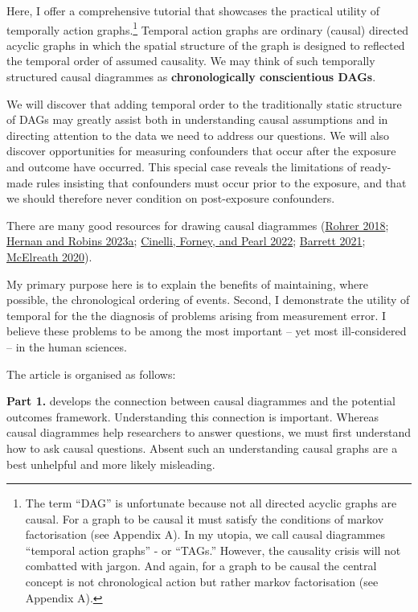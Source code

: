 \documentclass[
  singlecolumn]{report}
\begin{document}
Here, I offer a comprehensive tutorial that showcases the practical
utility of temporally action graphs.\footnote{The term ``DAG'' is
  unfortunate because not all directed acyclic graphs are causal. For a
  graph to be causal it must satisfy the conditions of markov
  factorisation (see Appendix A). In my utopia, we call causal
  diagrammes ``temporal action graphs'' - or ``TAGs.'' However, the
  causality crisis will not combatted with jargon. And again, for a
  graph to be causal the central concept is not chronological action but
  rather markov factorisation (see Appendix A).} Temporal action graphs
are ordinary (causal) directed acyclic graphs in which the spatial
structure of the graph is designed to reflected the temporal order of
assumed causality. We may think of such temporally structured causal
diagrammes as \textbf{chronologically conscientious DAGs}.

We will discover that adding temporal order to the traditionally static
structure of DAGs may greatly assist both in understanding causal
assumptions and in directing attention to the data we need to address
our questions. We will also discover opportunities for measuring
confounders that occur after the exposure and outcome have occurred.
This special case reveals the limitations of ready-made rules insisting
that confounders must occur prior to the exposure, and that we should
therefore never condition on post-exposure confounders.

There are many good resources for drawing causal diagrammes
(\protect\hyperlink{ref-rohrer2018}{Rohrer 2018};
\protect\hyperlink{ref-hernan2023}{Hernan and Robins 2023a};
\protect\hyperlink{ref-cinelli2022}{Cinelli, Forney, and Pearl 2022};
\protect\hyperlink{ref-barrett2021}{Barrett 2021};
\protect\hyperlink{ref-mcelreath2020}{McElreath 2020}).

My primary purpose here is to explain the benefits of maintaining, where
possible, the chronological ordering of events. Second, I demonstrate
the utility of temporal for the the diagnosis of problems arising from
measurement error. I believe these problems to be among the most
important -- yet most ill-considered -- in the human sciences.

The article is organised as follows:

\textbf{Part 1.} develops the connection between causal diagrammes and
the potential outcomes framework. Understanding this connection is
important. Whereas causal diagrammes help researchers to answer
questions, we must first understand how to ask causal questions. Absent
such an understanding causal graphs are a best unhelpful and more likely
misleading.
\end{document}
